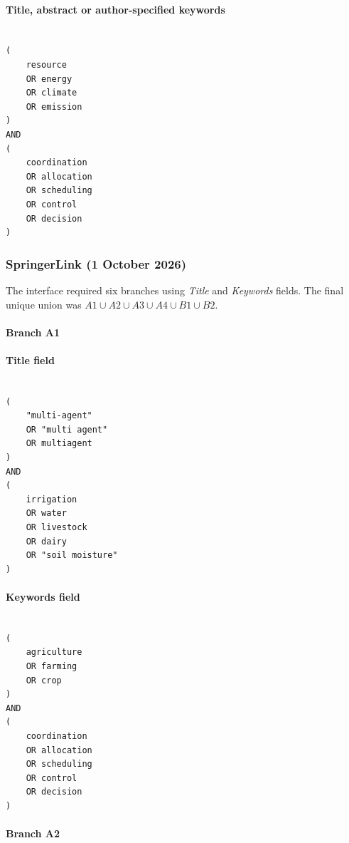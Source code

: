 \paragraph{Title, abstract or author-specified keywords}

\begin{lstlisting}

(
    resource
    OR energy
    OR climate
    OR emission
)
AND
(
    coordination
    OR allocation
    OR scheduling
    OR control
    OR decision
)

\end{lstlisting}

\subsubsection{SpringerLink (1 October 2026)}

The interface required six branches using \emph{Title} and \emph{Keywords} fields. The final unique union was $A1 \cup A2 \cup A3 \cup A4 \cup B1 \cup B2$.

\paragraph{Branch A1}

\paragraph{Title field}

\begin{lstlisting}

(
    "multi-agent"
    OR "multi agent"
    OR multiagent
)
AND
(
    irrigation
    OR water
    OR livestock
    OR dairy
    OR "soil moisture"
)

\end{lstlisting}

\paragraph{Keywords field}

\begin{lstlisting}

(
    agriculture
    OR farming
    OR crop
)
AND
(
    coordination
    OR allocation
    OR scheduling
    OR control
    OR decision
)

\end{lstlisting}

\paragraph{Branch A2}

